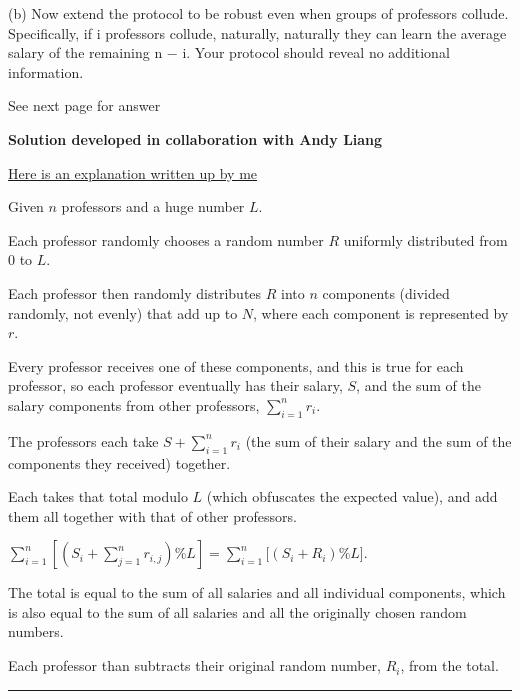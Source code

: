 \documentclass{article}
\begin{document}
(b) Now extend the protocol to be robust even when groups of professors collude. Specifically, if
i professors collude, naturally, naturally they can learn the average salary of the remaining
n − i. Your protocol should reveal no additional information.

See next page for answer

\newpage
\textbf{Solution developed in collaboration with Andy Liang}

\underline{Here is an explanation written up by me}\newline

Given $n$ professors and a huge number $L$.\newline

Each professor randomly chooses a random number $R$ uniformly distributed from 0 to $L$.\newline

Each professor then randomly distributes $R$ into $n$ components (divided randomly, not evenly) that add up to $N$, where each component is represented by $r$.\newline

Every professor receives one of these components, and this is true for each professor, so each professor eventually has their salary, $S$, and the sum of the salary components from other professors, $\sum_{i=1}^{n} r_i$.\newline

The professors each take $S+\sum_{i=1}^{n} r_i$ (the sum of their salary and the sum of the components they received) together. \newline

Each takes that total modulo $L$ (which obfuscates the expected value), and add them all together with that of other professors.\newline

$\sum_{i=1}^{n} [(S_i + \sum_{j=1}^{n} r_{i,j})\%L] = \sum_{i=1}^{n} [(S_i + R_i)\%L$].\newline

The total is equal to the sum of all salaries and all individual components, which is also equal to the sum of all salaries and all the originally chosen random numbers.\newline

Each professor than subtracts their original random number, $R_i$, from the total.\newline

\noindent\rule{10cm}{0.4pt}\newline
\end{document}
